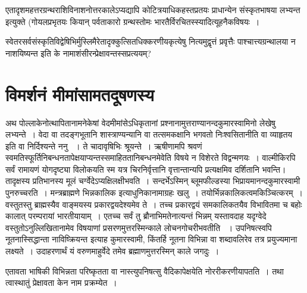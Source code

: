 एतादृशमहत्तरग्रन्थराशिविनाशनोत्तरकालेऽप्यद्यापि कोटित्रयाधिकहस्तप्रतयः प्राधान्येन संस्कृतभाषया लभ्यन्त इत्युक्ते (गोयलप्रभृतयः  कियान् पर्वताकारो ग्रन्थस्तोमः भारतैर्विरचितस्स्यादित्यूहनैकविषयः~।

स्वेतरसर्वसंस्कृतिविद्वेषिभिर्मुस्लिमैरेतादृक्कुत्सितधिक्करणीयकृत्येषु नित्यमुद्वृत्तं प्रवृत्तैः पाश्चात्त्यग्रन्थालया न नाशयिष्यन्त इति के नामाशंसीरन्प्रेक्षावन्तस्सप्रत्ययम्?


\section*{विमर्शनं मीमांसामतदूषणस्य}

अथ पोल्लाकेनोत्थापितानामनेकेषां वेदमीमांसेऽधिकृतानां प्रश्नानामुत्तराण्यानन्दकुमारस्वामिनो  लेखेषु लभ्यन्ते~। वेदा वा तदङ्गभूतानि शास्त्राण्यन्यानि वा तत्समकक्षानि भगवतो निःश्वसितानीति वा व्याहृतय इति वा निर्दिश्यन्ते ननु ~। ते चादावृषिभिः श्रूयन्ते~। ऋषीणामपि श्रवणं स्वमतिस्फूर्तिनिबन्धनतापेक्षयाप्यन्तस्समाहिततानिबन्धनमेवेति विषये न विशेरते विद्वन्मणयः~। वाल्मीकिरपि सर्वं रामायणं योगदृष्ट्या विलोकयति स्म यत्र चिरनिर्वृत्तानि वृत्तान्तान्यपि प्रत्यक्षमिव दर्शितानि भवन्ति। तादृक्षस्य प्रतिभानस्य मूलं चर्ग्वेदेऽप्यक्षिलक्षीभवति~। सन्दर्भेऽस्मिन् ब्लूमफील्डस्या भिप्रायमानन्दकुमारस्वामी पुनरुच्चरति~। मन्त्रब्राह्मणे भिन्नकालिक इत्याधुनिकानामाग्रहः खलु~। तयोर्भिन्नकालिकत्वमकिञ्चित्करम्~। वस्तुतस्तु ब्राह्मस्यैव वाङ्मयस्य प्रकारद्वयदेश्यमेव ते~। तच्च प्रकारद्वयं समकालिकतयैव विभावितमा च बहोः कालात् परम्परायां भारतीयायाम्~। एतच्च सर्वं तु ब्रौनाभिमतेनात्यन्तं भिन्नम्  यस्तावदाह यदृग्वेदे वस्तुतोऽनुल्लिखितानामेव विषयाणां प्रसरणमुत्तरस्मिन्काले लोचनगोचरीभवतीति ~। उपनिषत्स्वपि नूतनास्सिद्धान्ता नाविष्क्रियन्त इत्याह कुमारस्वामी, किंतर्हि नूतना विभिन्ना वा शब्दावलिरेव तत्र प्रयुज्यमाना लक्ष्यते~। उदाहरणार्थं यं वरुणमाहुर्वेदे तमेव ब्रह्माणमुत्तरस्मिन् काले जगदुः~।

एतावता भाषिकी विभिन्नता परिष्कृतता वा नास्त्युपनिषत्सु वैदिकापेक्षयेति नोररीकरणीयापतति~। तथा त्वास्थातुं प्रेक्षावता केन नाम प्रक्रम्येत~।

\begin{myquote}

~\hfill {}
\end{myquote}

